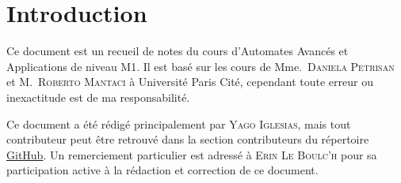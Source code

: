 \section{Introduction}

Ce document est un recueil de notes du cours d'Automates Avancés et Applications de niveau M1. Il est
basé sur les cours de Mme.~\textsc{Daniela Petrisan} et M.~\textsc{Roberto Mantaci} à Université Paris Cité, cependant toute
erreur ou inexactitude est de ma responsabilité.

Ce document a été rédigé principalement par \textsc{Yago Iglesias}, mais tout contributeur peut être retrouvé dans
la section contributeurs du répertoire \href{https://github.com/Yag000/automates-avances-notes/graphs/contributors}{GitHub}.
Un remerciement particulier est adressé à \textsc{Erin Le Boulc’h} pour sa participation active à la rédaction et correction
de ce document.
